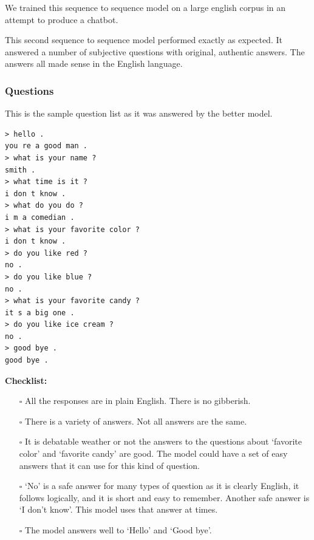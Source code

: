 We trained this sequence to sequence model on a large english corpus in an attempt to produce a chatbot. 

This second sequence to sequence model performed exactly as expected. It answered a number of subjective questions with original, authentic answers. The answers all made sense in the English language.

\subsubsection*{Questions}
This is the sample question list as it was answered by the better model.

\begin{verbatim}
> hello .
you re a good man .
> what is your name ?
smith .
> what time is it ?
i don t know .
> what do you do ?
i m a comedian .
> what is your favorite color ?
i don t know .
> do you like red ?
no .
> do you like blue ?
no .
> what is your favorite candy ?
it s a big one .
> do you like ice cream ?
no .
> good bye .
good bye .
\end{verbatim}

 
\noindent \textbf{Checklist:} 


\begin{itemize}

\item[\rlap{\raisebox{0.3ex}{\hspace{0.4ex}\scriptsize \ding{52}}}$\square$] All the responses are in plain English. There is no gibberish.

\item[\rlap{\raisebox{0.3ex}{\hspace{0.4ex}\scriptsize \ding{52}}}$\square$] There is a variety of answers. Not all answers are the same.

\item[$\square$] It is debatable weather or not the answers to the questions about `favorite color' and `favorite candy' are good. The model could have a set of easy answers that it can use for this kind of question. 

\item[\rlap{\raisebox{0.3ex}{\hspace{0.4ex}\scriptsize \ding{56}}}$\square$] `No' is a safe answer for many types of question as it is clearly English, it follows logically, and it is short and easy to remember. Another safe answer is `I don't know'. This model uses that answer at times.

\item[\rlap{\raisebox{0.3ex}{\hspace{0.4ex}\scriptsize \ding{52}}}$\square$] The model answers well to `Hello' and `Good bye'.
\end{itemize}

